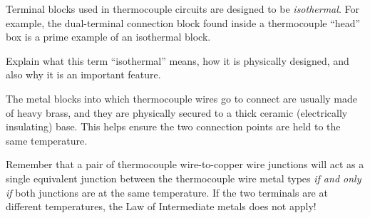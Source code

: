 

Terminal blocks used in thermocouple circuits are designed to be {\it isothermal}.  For example, the dual-terminal connection block found inside a thermocouple ``head'' box is a prime example of an isothermal block.  

Explain what this term ``isothermal'' means, how it is physically designed, and also why it is an important feature.







The metal blocks into which thermocouple wires go to connect are usually made of heavy brass, and they are physically secured to a thick ceramic (electrically insulating) base.  This helps ensure the two connection points are held to the same temperature.







Remember that a pair of thermocouple wire-to-copper wire junctions will act as a single equivalent junction between the thermocouple wire metal types {\it if and only if} both junctions are at the same temperature.  If the two terminals are at different temperatures, the Law of Intermediate metals does not apply!




